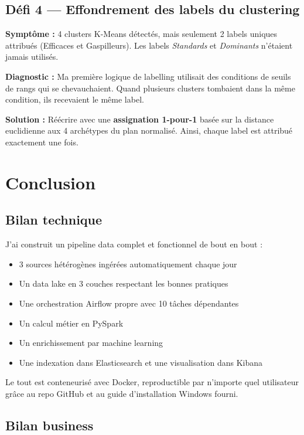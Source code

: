 \documentclass[11pt,a4paper]{article}
\begin{document}
\subsection*{Défi 4 — Effondrement des labels du clustering}

\textbf{Symptôme :} 4 clusters K-Means détectés, mais seulement 2 labels uniques
attribués (Efficaces et Gaspilleurs). Les labels \textit{Standards} et
\textit{Dominants} n'étaient jamais utilisés.

\textbf{Diagnostic :} Ma première logique de labelling utilisait des conditions
de seuils de rangs qui se chevauchaient. Quand plusieurs clusters tombaient
dans la même condition, ils recevaient le même label.

\textbf{Solution :} Réécrire avec une \textbf{assignation 1-pour-1} basée sur
la distance euclidienne aux 4 archétypes du plan normalisé. Ainsi, chaque
label est attribué exactement une fois.

\section{Conclusion}

\subsection*{Bilan technique}

J'ai construit un pipeline data complet et fonctionnel de bout en bout :

\begin{itemize}
  \item 3 sources hétérogènes ingérées automatiquement chaque jour
  \item Un data lake en 3 couches respectant les bonnes pratiques
  \item Une orchestration Airflow propre avec 10 tâches dépendantes
  \item Un calcul métier en PySpark
  \item Un enrichissement par machine learning
  \item Une indexation dans Elasticsearch et une visualisation dans Kibana
\end{itemize}

Le tout est conteneurisé avec Docker, reproductible par n'importe quel
utilisateur grâce au repo GitHub et au guide d'installation Windows fourni.

\subsection*{Bilan business}
\end{document}
